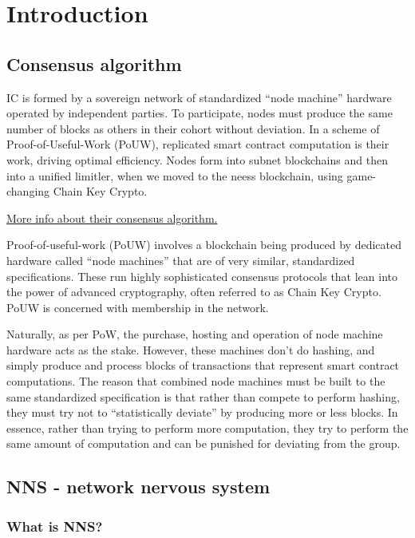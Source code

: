 \chapter{Introduction}
\label{chap:Introduction}

\section{Consensus algorithm}

IC is formed by a sovereign network of standardized ``node machine'' hardware operated by independent parties. To participate, nodes must produce the same number of blocks as others in their cohort without deviation. In a scheme of Proof-of-Useful-Work (PoUW), replicated smart contract computation is their work, driving optimal efficiency. Nodes form into subnet blockchains and then into a unified limitler, when we moved to the neess blockchain, using game-changing Chain Key Crypto.

\href{https://wiki.internetcomputer.org/wiki/Proof_of_Useful_Work}{More info about their consensus algorithm.}

Proof-of-useful-work (PoUW) involves a blockchain being produced by dedicated hardware called ``node machines'' that are of very similar, standardized specifications. These run highly sophisticated consensus protocols that lean into the power of advanced cryptography, often referred to as Chain Key Crypto. PoUW is concerned with membership in the network.

Naturally, as per PoW, the purchase, hosting and operation of node machine hardware acts as the stake. However, these machines don't do hashing, and simply produce and process blocks of transactions that represent smart contract computations. The reason that combined node machines must be built to the same standardized specification is that rather than compete to perform hashing, they must try not to ``statistically deviate'' by producing more or less blocks. In essence, rather than trying to perform more computation, they try to perform the same amount of computation and can be punished for deviating from the group.

\section{NNS - network nervous system}

\subsection{What is NNS?}

